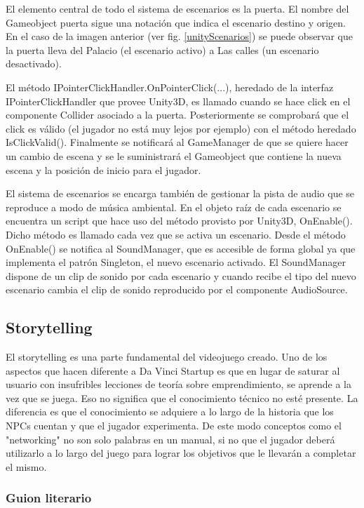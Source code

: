 El elemento central de todo el sistema de escenarios es la puerta. El nombre del Gameobject puerta sigue una notación que indica el escenario destino y origen. En el caso de la imagen anterior (ver fig. \ref{unityScenarios}) se puede observar que la puerta lleva del Palacio (el escenario activo) a Las calles (un escenario desactivado).

El método IPointerClickHandler.OnPointerClick(...), heredado de la interfaz IPointerClickHandler que provee Unity3D, es llamado cuando se hace click en el componente Collider asociado a la puerta. Posteriormente se comprobará que el click es válido (el jugador no está muy lejos por ejemplo) con el método heredado IsClickValid(). Finalmente se notificará al GameManager de que se quiere hacer un cambio de escena y se le suministrará el Gameobject que contiene la nueva escena y la posición de inicio para el jugador.

El sistema de escenarios se encarga también de gestionar la pista de audio que se reproduce a modo de música ambiental. En el objeto raíz de cada escenario se encuentra un script que hace uso del método provisto por Unity3D, OnEnable(). Dicho método es llamado cada vez que se activa un escenario. Desde el método OnEnable() se notifica al SoundManager, que es accesible de forma global ya que implementa el patrón Singleton, el nuevo escenario activado. El SoundManager dispone de un clip de sonido por cada escenario y cuando recibe el tipo del nuevo escenario cambia el clip de sonido reproducido por el componente AudioSource.

\subsection{Storytelling}

El storytelling es una parte fundamental del videojuego creado. Uno de los aspectos que hacen diferente a Da Vinci Startup es que en lugar de saturar al usuario con insufribles lecciones de teoría sobre emprendimiento, se aprende a la vez que se juega. Eso no significa que el conocimiento técnico no esté presente. La diferencia es que el conocimiento se adquiere a lo largo de la historia que los NPCs cuentan y que el jugador experimenta. De este modo conceptos como el "networking" no son solo palabras en un manual, si no que el jugador deberá utilizarlo a lo largo del juego para lograr los objetivos que le llevarán a completar el mismo.

\subsubsection{Guion literario}

